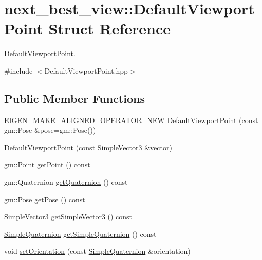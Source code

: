\hypertarget{structnext__best__view_1_1DefaultViewportPoint}{\section{next\-\_\-best\-\_\-view\-:\-:\-Default\-Viewport\-Point \-Struct \-Reference}
\label{structnext__best__view_1_1DefaultViewportPoint}
}


\hyperlink{structnext__best__view_1_1DefaultViewportPoint}{\-Default\-Viewport\-Point}.  




{\ttfamily \#include $<$\-Default\-Viewport\-Point.\-hpp$>$}

\subsection*{\-Public \-Member \-Functions}
\begin{DoxyCompactItemize}
\item 
\-E\-I\-G\-E\-N\-\_\-\-M\-A\-K\-E\-\_\-\-A\-L\-I\-G\-N\-E\-D\-\_\-\-O\-P\-E\-R\-A\-T\-O\-R\-\_\-\-N\-E\-W \hyperlink{structnext__best__view_1_1DefaultViewportPoint_acbe61c83a79b90cfe029f8fb3d81306f}{\-Default\-Viewport\-Point} (const gm\-::\-Pose \&pose=gm\-::\-Pose())
\item 
\hyperlink{structnext__best__view_1_1DefaultViewportPoint_af7a537163a75bea8e276a6b5168b8fb2}{\-Default\-Viewport\-Point} (const \hyperlink{namespacenext__best__view_a59fc75b908e198bc02a9b19ba88edf12}{\-Simple\-Vector3} \&vector)
\item 
gm\-::\-Point \hyperlink{structnext__best__view_1_1DefaultViewportPoint_ac17931857331b959f700b26f17685655}{get\-Point} () const 
\item 
gm\-::\-Quaternion \hyperlink{structnext__best__view_1_1DefaultViewportPoint_a59eadb1d63dbcdee18c5c58b3b6b0628}{get\-Quaternion} () const 
\item 
gm\-::\-Pose \hyperlink{structnext__best__view_1_1DefaultViewportPoint_a39a293ce18698f7ab4ebbb41f7d509cc}{get\-Pose} () const 
\item 
\hyperlink{namespacenext__best__view_a59fc75b908e198bc02a9b19ba88edf12}{\-Simple\-Vector3} \hyperlink{structnext__best__view_1_1DefaultViewportPoint_ab662b3a88bfdec1d51bbe7e92f42d93f}{get\-Simple\-Vector3} () const 
\item 
\hyperlink{namespacenext__best__view_a165f1f159539ff8e583fb7fe3620390c}{\-Simple\-Quaternion} \hyperlink{structnext__best__view_1_1DefaultViewportPoint_a38d0cbe93ea4f52dfc3f48d5db85743d}{get\-Simple\-Quaternion} () const 
\item 
void \hyperlink{structnext__best__view_1_1DefaultViewportPoint_a12349749eaea8dfe7a4fab4af80d02aa}{set\-Orientation} (const \hyperlink{namespacenext__best__view_a165f1f159539ff8e583fb7fe3620390c}{\-Simple\-Quaternion} \&orientation)
\end{DoxyCompactItemize}
